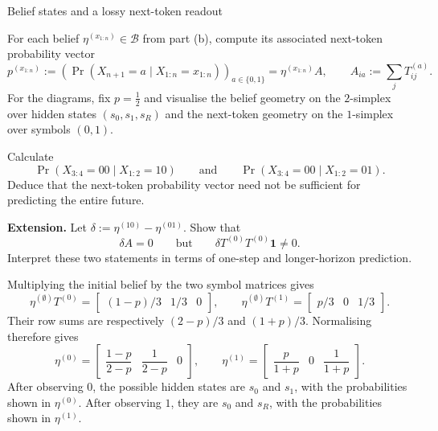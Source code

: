 \begin{exercise}[Core]{Belief states and a lossy next-token readout}
\begin{parts}
    \item For each belief $\eta^{(x_{1:n})}\in\mathcal B$ from part (b),
      compute its associated next-token probability vector
      \[
        p^{(x_{1:n})}
        :=\left(
          \Pr(X_{n+1}=a\mid X_{1:n}=x_{1:n})
        \right)_{a\in\{0,1\}}
        =\eta^{(x_{1:n})}A,
        \qquad
        A_{ia}:=\sum_jT^{(a)}_{ij}.
      \]
      For the diagrams, fix $p=\tfrac12$ and visualise the belief geometry on
      the $2$-simplex over hidden states $(s_0,s_1,s_R)$ and the next-token
      geometry on the $1$-simplex over symbols $(0,1)$.

    \item Calculate
      \[
        \Pr(X_{3:4}=00\mid X_{1:2}=10)
        \qquad\text{and}\qquad
        \Pr(X_{3:4}=00\mid X_{1:2}=01).
      \]
      Deduce that the next-token probability vector need not be sufficient for
      predicting the entire future.

    \item \textbf{Extension.} Let
      $\delta:=\eta^{(10)}-\eta^{(01)}$. Show that
      \[
        \delta A=0
        \qquad\text{but}\qquad
        \delta T^{(0)}T^{(0)}\mathbf 1\neq0.
      \]
      Interpret these two statements in terms of one-step and longer-horizon
      prediction.
  \end{parts}

  \begin{solution}
    \begin{parts}
      \item Multiplying the initial belief by the two symbol matrices gives
        \[
          \eta^{(\emptyset)}T^{(0)}
            =\begin{bmatrix}(1-p)/3&1/3&0\end{bmatrix},
          \qquad
          \eta^{(\emptyset)}T^{(1)}
            =\begin{bmatrix}p/3&0&1/3\end{bmatrix}.
        \]
        Their row sums are respectively $(2-p)/3$ and $(1+p)/3$.
        Normalising therefore gives
        \[
          \eta^{(0)}
            =\begin{bmatrix}\dfrac{1-p}{2-p}&\dfrac1{2-p}&0\end{bmatrix},
          \qquad
          \eta^{(1)}
            =\begin{bmatrix}\dfrac p{1+p}&0&\dfrac1{1+p}\end{bmatrix}.
        \]
        After observing $0$, the possible hidden states are $s_0$ and $s_1$,
        with the probabilities shown in $\eta^{(0)}$. After observing $1$,
        they are $s_0$ and $s_R$, with the probabilities shown in $\eta^{(1)}$.


\end{parts}
\end{solution}
\end{exercise}
